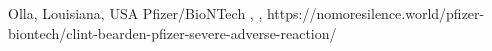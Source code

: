           {Olla, Louisiana, USA}
          {}
          {Pfizer/BioNTech}
          {}
          {
            ,
            ,
          }
          {https://nomoresilence.world/pfizer-biontech/clint-bearden-pfizer-severe-adverse-reaction/}
